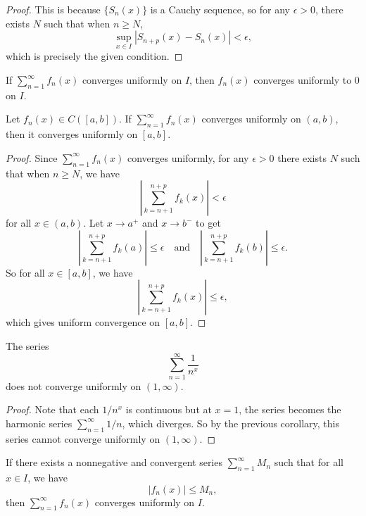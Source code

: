 \begin{proof}
  This is because $\{S_n(x)\}$ is a Cauchy sequence, so
  for any $\epsilon > 0$, there exists $N$ such that
  when $n \ge N$,
  \[
    \sup_{x \in I} |S_{n + p}(x) - S_{n}(x)| < \epsilon,
  \]
  which is precisely the given condition.
\end{proof}

\begin{corollary}
  If $\sum_{n = 1}^\infty f_n(x)$ converges uniformly
  on $I$, then $f_n(x)$ converges uniformly to $0$
  on $I$.
\end{corollary}

\begin{corollary}
  Let $f_n(x) \in C([a, b])$. If $\sum_{n = 1}^\infty f_n(x)$
  converges uniformly on $(a, b)$, then
  it converges uniformly on $[a, b]$.
\end{corollary}

\begin{proof}
  Since $\sum_{n = 1}^\infty f_n(x)$ converges uniformly,
  for any $\epsilon > 0$ there exists $N$ such that
  when $n \ge N$, we have
  \[
    \left| \sum_{k = n + 1}^{n + p} f_k(x) \right| < \epsilon
  \]
  for all $x \in (a, b)$. Let $x \to a^+$ and
  $x \to b^-$ to get
  \[
    \left| \sum_{k = n + 1}^{n + p} f_k(a) \right| \le \epsilon
    \quad \text{and} \quad
    \left| \sum_{k = n + 1}^{n + p} f_k(b) \right| \le \epsilon.
  \]
  So for all $x \in [a, b]$, we have
  \[
    \left| \sum_{k = n + 1}^{n + p} f_k(x) \right| \le \epsilon,
  \]
  which gives uniform convergence on $[a, b]$.
\end{proof}

\begin{example}
  The series
  \[
    \sum_{n = 1}^\infty \frac{1}{n^x}
  \]
  does not converge uniformly on $(1, \infty)$.
\end{example}

\begin{proof}
  Note that each $1 / n^x$ is continuous
  but at $x = 1$, the series becomes the harmonic
  series
  $\sum_{n = 1}^\infty 1 / n$, which diverges.
  So by the previous
  corollary, this series cannot converge uniformly on
  $(1, \infty)$.
\end{proof}

\begin{theorem}
  If there exists a nonnegative and convergent
  series $\sum_{n = 1}^\infty M_n$ such that for all
  $x \in I$, we have
  \[
    |f_n(x)| \le M_n,
  \]
  then $\sum_{n = 1}^\infty f_n(x)$ converges
  uniformly on $I$.
\end{theorem}

